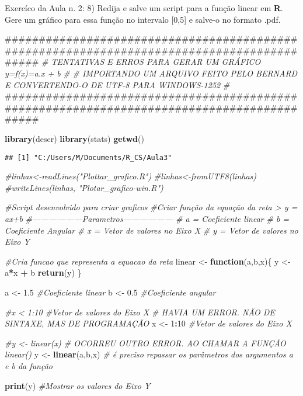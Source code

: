 \documentclass[]{article}
\newenvironment{Shaded}{\begin{snugshade}}{\end{snugshade}}
\newcommand{\KeywordTok}[1]{\textcolor[rgb]{0.13,0.29,0.53}{\textbf{#1}}}
\newcommand{\DecValTok}[1]{\textcolor[rgb]{0.00,0.00,0.81}{#1}}
\newcommand{\FloatTok}[1]{\textcolor[rgb]{0.00,0.00,0.81}{#1}}
\newcommand{\StringTok}[1]{\textcolor[rgb]{0.31,0.60,0.02}{#1}}
\newcommand{\CommentTok}[1]{\textcolor[rgb]{0.56,0.35,0.01}{\textit{#1}}}
\newcommand{\ControlFlowTok}[1]{\textcolor[rgb]{0.13,0.29,0.53}{\textbf{#1}}}
\newcommand{\OperatorTok}[1]{\textcolor[rgb]{0.81,0.36,0.00}{\textbf{#1}}}
\newcommand{\NormalTok}[1]{#1}
\begin{document}
Exercíco da Aula n. 2: 8) Redija e salve um script para a função linear
em \textbf{R}. Gere um gráfico para essa função no intervalo {[}0,5{]} e
salve-o no formato .pdf.

\begin{Shaded}
\begin{Highlighting}[]
\NormalTok{###########################################################################################}
\CommentTok{# TENTATIVAS E  ERROS PARA GERAR UM GRÁFICO y=f(x)=a.x + b }
\CommentTok{#}
\CommentTok{# IMPORTANDO UM ARQUIVO FEITO PELO BERNARD E CONVERTENDO-O DE UTF-8 PARA WINDOWS-1252}
\CommentTok{#}
\NormalTok{###########################################################################################}

\KeywordTok{library}\NormalTok{(descr)}
\KeywordTok{library}\NormalTok{(stats)}
\KeywordTok{getwd}\NormalTok{()}
\end{Highlighting}
\end{Shaded}

\begin{verbatim}
## [1] "C:/Users/M/Documents/R_CS/Aula3"
\end{verbatim}

\begin{Shaded}
\begin{Highlighting}[]
\CommentTok{#linhas<-readLines("Plottar_grafico.R")}
\CommentTok{#linhas<-fromUTF8(linhas)}
\CommentTok{#writeLines(linhas, "Plotar_grafico-win.R")}

\CommentTok{#Script desenvolvido para criar graficos}
\CommentTok{#Criar função da equação da reta > y = ax+b}
\CommentTok{#------------------Parametros------------------}
\CommentTok{#     a = Coeficiente linear}
\CommentTok{#     b = Coeficiente Angular}
\CommentTok{#     x = Vetor de valores no Eixo X}
\CommentTok{#     y = Vetor de valores no Eixo Y}

\CommentTok{#Cria funcao que representa a equacao da reta}
\NormalTok{linear <-}\StringTok{ }\ControlFlowTok{function}\NormalTok{(a,b,x)\{}
\NormalTok{  y <-}\StringTok{ }\NormalTok{a}\OperatorTok{*}\NormalTok{x }\OperatorTok{+}\StringTok{ }\NormalTok{b}
  \KeywordTok{return}\NormalTok{(y)}
\NormalTok{\}}

\NormalTok{a <-}\StringTok{ }\FloatTok{1.5} \CommentTok{#Coeficiente linear}
\NormalTok{b <-}\StringTok{ }\FloatTok{0.5} \CommentTok{#Coeficiente angular}

\CommentTok{#x < 1:10 #Vetor de valores do Eixo X # HAVIA UM ERROR. NÃO DE SINTAXE, MAS DE PROGRAMAÇÃO}
\NormalTok{x <-}\StringTok{ }\DecValTok{1}\OperatorTok{:}\DecValTok{10} \CommentTok{#Vetor de valores do Eixo X}

\CommentTok{#y <- linear(x) # OCORREU OUTRO ERROR. AO CHAMAR A FUNÇÃO linear()}
\NormalTok{y <-}\StringTok{ }\KeywordTok{linear}\NormalTok{(a,b,x) }\CommentTok{# é preciso repassar os parâmetros dos argumentos a e b da função}

\KeywordTok{print}\NormalTok{(y) }\CommentTok{#Mostrar os valores do Eixo Y}
\end{Highlighting}
\end{Shaded}
\end{document}
